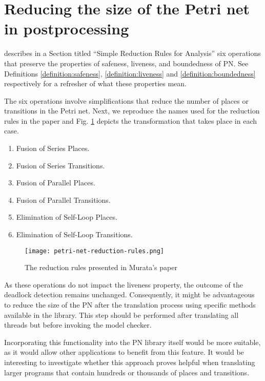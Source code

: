 \section{Reducing the size of the Petri net in postprocessing}
\label{sec:future-work-petri-net-reduction}

\cite{murata1989} describes in a Section titled ``Simple Reduction Rules for Analysis''
six operations that preserve the properties of safeness, liveness, and boundedness of \acrshort{PN}.
See Definitions \ref{definition:safeness}, \ref{definition:liveness} and \ref{definition:boundedness}
respectively for a refresher of what these properties mean.

The six operations involve simplifications that reduce the number of places or transitions
in the Petri net. Next, we reproduce the names used for the reduction rules in the paper and
Fig. \ref{fig:petri-net-reduction-rules} depicts the transformation that takes place in each case.

\begin{enumerate}[label={\alph*)}]
  \item Fusion of Series Places.
  \item Fusion of Series Transitions.
  \item Fusion of Parallel Places.
  \item Fusion of Parallel Transitions.
  \item Elimination of Self-Loop Places.
  \item Elimination of Self-Loop Transitions.
\end{enumerate}

\begin{figure}[!htb]
  \centering
  \texttt{[image: petri-net-reduction-rules.png]}
  \caption{The reduction rules presented in Murata's paper}
  \label{fig:petri-net-reduction-rules}
\end{figure}

As these operations do not impact the liveness property,
the outcome of the deadlock detection remains unchanged.
Consequently, it might be advantageous to reduce the size of the \acrshort{PN}
after the translation process using specific methods available in the  library.
This step should be performed after translating all threads but before invoking the model checker.

Incorporating this functionality into the \acrshort{PN} library itself would be more suitable,
as it would allow other applications to benefit from this feature.
It would be interesting to investigate whether
this approach proves helpful when translating larger programs
that contain hundreds or thousands of places and transitions.


